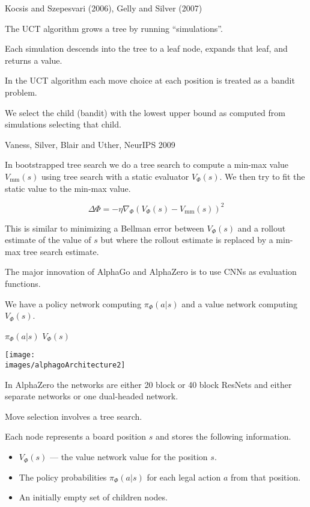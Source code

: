 {
{Kocsis and Szepesvari (2006), Gelly and Silver (2007)}

The UCT algorithm grows a tree by running ``simulations''.

\vfill
Each simulation descends into the tree to a leaf node, expands that leaf, and returns a value.

\vfill
In the UCT algorithm each move choice at each position is treated as a bandit problem.

\vfill
We select the child (bandit) with the lowest upper bound as computed from simulations selecting that child.


{Vaness, Silver, Blair and Uther, NeurIPS 2009}

In bootstrapped tree search we do a tree search to compute a min-max value $V_{\mathrm{mm}}(s)$
using tree search with a static evaluator $V_\Phi(s)$.  We then try to fit the static value to the min-max value.

\vfill
$$\Delta \Phi = - \eta \nabla_\Phi \left(V_\Phi(s) - V_{\mathrm{mm}}(s)\right)^2$$

\vfill
This is similar to minimizing a Bellman error between $V_\Phi(s)$ and a rollout estimate of the value of $s$ but where the rollout
estimate is replaced by a min-max tree search estimate.



The major innovation of AlphaGo and AlphaZero is to use CNNs as evaluation functions.

\vfill
We have a policy network computing $\pi_\Phi(a|s)$ and a value network computing $V_\Phi(s)$.


\centerline{$\pi_\Phi(a|s)$ \hspace{.5in} $V_\Phi(s)$}
\centerline{\texttt{[image: \\images/alphagoArchitecture2]}}

\vfill
In AlphaZero the networks are either 20 block or 40 block ResNets and either separate networks or one dual-headed network.


Move selection involves a tree search.

\vfill
Each node represents a board position $s$ and stores the following information.

\vfill
\begin{itemize}
\item $V_\Phi(s)$ --- the value network value for the position $s$.
\vfill
\item The policy probabilities $\pi_\Phi(a|s)$ for each legal action $a$
from that position.
\vfill
\item An initially empty set of children nodes.
\end{itemize}


}
